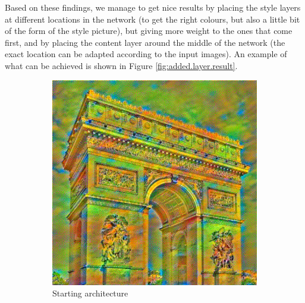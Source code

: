 \documentclass[twocolumn,superscriptaddress,aps,floatfix,nofootinbib]{revtex4-1}
\begin{document}
    Based on these findings, we manage to get nice results by placing the style layers at different locations in the network (to get the right colours, but also a little bit of the form of the style picture), but giving more weight to the ones that come first, and by placing the content layer around the middle of the network (the exact location can be adapted according to the input images). An example of what can be achieved is shown in Figure \ref{fig:added.layer.result}. 
    
    \begin{figure}[ht]
        \centering
        \begin{subfigure}[b]{0.22\textwidth}
            \centering
            \includegraphics[width=\textwidth]{resources/png/layers/layers_default.png}
            \caption{Starting architecture}
        \end{subfigure}
        \hfill
        \begin{subfigure}[b]{0.22\textwidth}
            \centering

\end{subfigure}
\end{figure}
\end{document}
